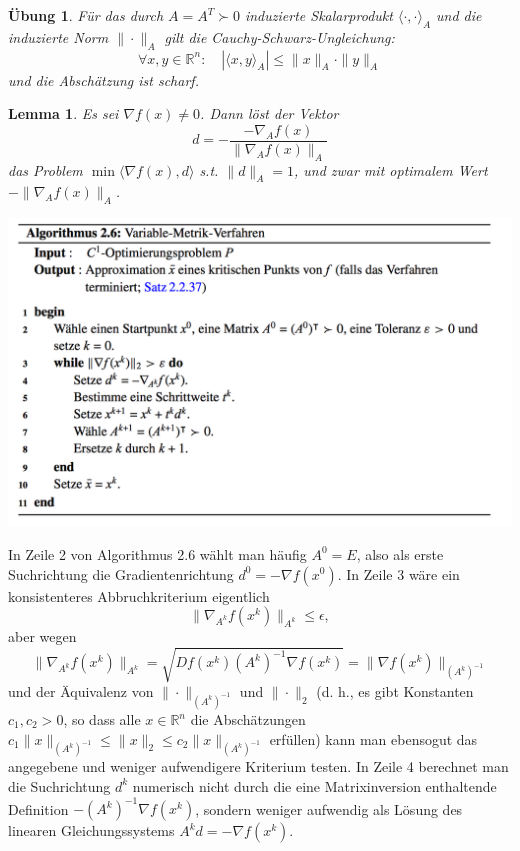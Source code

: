 \documentclass[11pt]{scrreprt}
\newcounter{thm}
\theoremstyle{thmstyle}
\numberwithin{thm}{section}
\newtheorem{lemma}[thm]{Lemma}
\newtheorem{uebung}[thm]{Übung}
\begin{document}
\begin{uebung}
	Für das durch $A = A^T \succ 0$ induzierte Skalarprodukt $\langle \cdot, \cdot \rangle_A$ und die induzierte Norm $\| \cdot \|_A$ gilt die Cauchy-Schwarz-Ungleichung:
		$$ \forall x,y \in \mathbb{R}^n: \quad \left| \langle x, y \rangle_A \right| \leq \| x \|_A \cdot \| y \|_A $$
	und die Abschätzung ist scharf.
\end{uebung}

\begin{lemma}
	Es sei $\nabla f(x) \neq 0$. Dann löst der Vektor 
	$$ d = - \frac{- \nabla_A f(x)}{\| \nabla_A f(x) \|_A} $$
	das Problem $\min \langle \nabla f(x), d \rangle$ s.t. $\| d \|_A = 1$, und zwar mit optimalem Wert $- \| \nabla_A f(x) \|_A$.
\end{lemma}

\begin{center}
	\includegraphics[scale=0.5]{img/a26}
\end{center}

In Zeile 2 von Algorithmus 2.6 wählt man häufig $A^0 = E$, also als erste Suchrichtung die Gradientenrichtung $d^0 = - \nabla f(x^0)$. In Zeile 3 wäre ein konsistenteres Abbruchkriterium eigentlich 
		$$ \| \nabla_{A^{k}} f(x^k) \|_{A^k} \leq \epsilon, $$
	aber wegen
		$$ \| \nabla_{A^{k}} f(x^k) \|_{A^k} = \sqrt{D f(x^k) (A^k)^{-1} \nabla f(x^k)} = \| \nabla f(x^k) \|_{(A^k)^{-1}} $$
	und der Äquivalenz von $\| \cdot \|_{(A^{k})^{-1}}$ und $\| \cdot \|_2$ (d. h., es gibt Konstanten $c_1, c_2 > 0$, so dass alle $x \in \mathbb{R}^n$ die Abschätzungen $c_1 \| x \|_{(A^{k})^{-1}}\leq \| x \|_2 \leq c_2 \| x \|_{(A^k)^{-1}}$ erfüllen) kann man ebensogut das angegebene und weniger aufwendigere Kriterium testen. In Zeile 4 berechnet man die Suchrichtung $d^k$ numerisch nicht durch die eine Matrixinversion enthaltende Definition $-(A^k)^{-1} \nabla f(x^k)$, sondern weniger aufwendig als Lösung des linearen Gleichungssystems $A^k d = - \nabla f(x^k)$. ~\bigskip
\end{document}
